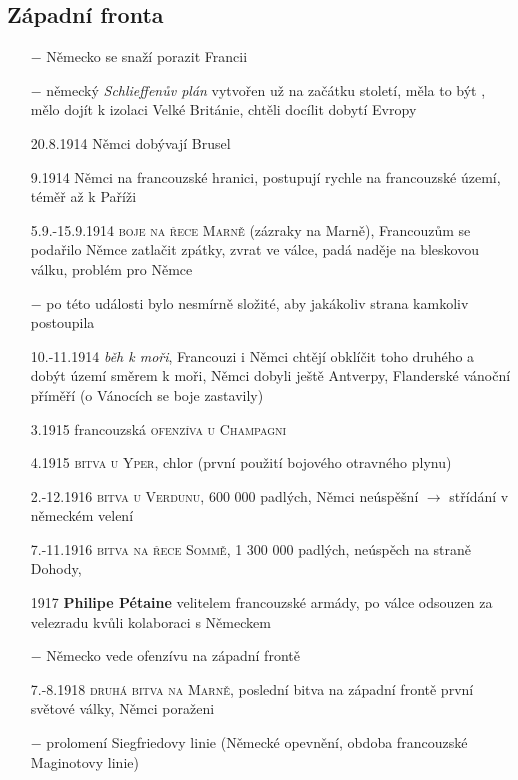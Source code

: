 \documentclass{article}
\begin{document}
\subsection*{Západní fronta}
\begin{itemize}
    \vspace{-0.5em}
    \setlength\itemsep{0.15em}
    \item[$-$] Německo se snaží porazit Francii
    \item[$-$] německý \textit{Schlieffenův plán} vytvořen už na začátku století, měla to být , mělo dojít k izolaci Velké Británie, chtěli docílit dobytí Evropy
    \item[20.8.1914] Němci dobývají Brusel
    \item[9.1914] Němci na francouzské hranici, postupují rychle na francouzské území, téměř až k Paříži
    \item[5.9.-15.9.1914] \textsc{boje na řece Marně} (zázraky na Marně), Francouzům se podařilo Němce zatlačit zpátky, zvrat ve válce, padá naděje na bleskovou válku, problém pro Němce
    \item[$-$] po této události bylo nesmírně složité, aby jakákoliv strana kamkoliv postoupila
    \item[10.-11.1914] \textit{běh k moři}, Francouzi i Němci chtějí obklíčit toho druhého a dobýt území směrem k moři, Němci dobyli ještě Antverpy, Flanderské vánoční příměří (o Vánocích se boje zastavily)
    \item[3.1915] francouzská \textsc{ofenzíva u Champagni}
    \item[4.1915] \textsc{bitva u Yper}, chlor (první použití bojového otravného plynu)
    \item[2.-12.1916]  \textsc{bitva u Verdunu}, 600 000 padlých, Němci neúspěšní $\rightarrow$ střídání v německém velení
    \item[7.-11.1916] \textsc{bitva na řece Sommě}, 1 300 000 padlých, neúspěch na straně Dohody,
    \item[1917] \textbf{Philipe Pétaine}  velitelem francouzské armády, po válce odsouzen za velezradu kvůli kolaboraci s Německem
    \item[$-$] Německo vede ofenzívu na západní frontě
    \item[7.-8.1918] \textsc{druhá bitva na Marně}, poslední bitva na západní frontě první světové války, Němci poraženi
    \item[$-$] prolomení Siegfriedovy linie (Německé opevnění, obdoba francouzské Maginotovy linie)
\end{itemize}
\end{document}
